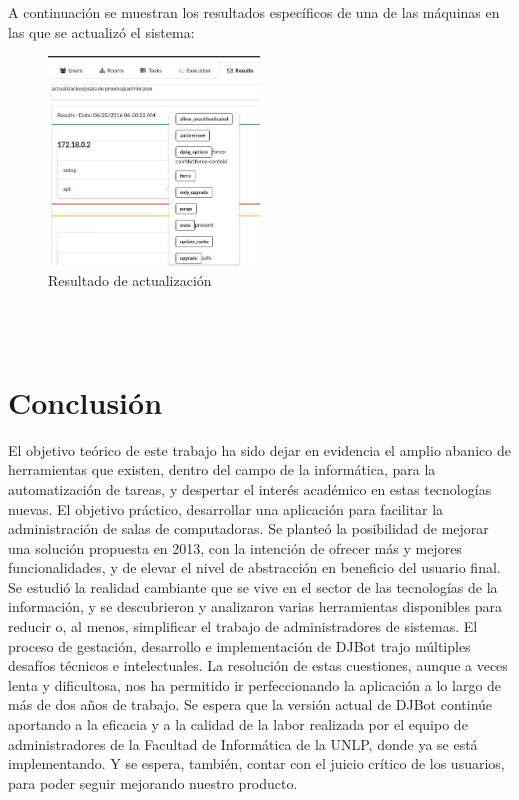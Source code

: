 \documentclass[a4paper,12pt]{article}
\begin{document}
A continuación se muestran los resultados específicos de una de las máquinas en las que se actualizó el sistema:

\begin{figure}[htb]
\centering
\includegraphics[width=0.5\textwidth]{./img/actualizacion.jpg}
\caption{Resultado de actualización}
\end{figure}\\



\newpage\\
\section{Conclusión}
\label{sec:orgheadline31}

El objetivo teórico de este trabajo ha sido dejar en evidencia el amplio abanico de herramientas que existen, dentro del campo de la informática, para la automatización de tareas, y despertar el interés académico en estas tecnologías nuevas. El objetivo práctico, desarrollar una aplicación para facilitar la administración de salas de computadoras. Se planteó la posibilidad de mejorar una solución propuesta en 2013, con la intención de ofrecer más y mejores funcionalidades, y de elevar el nivel de abstracción en beneficio del usuario final. Se estudió la realidad cambiante que se vive en el sector de las tecnologías de la información, y se descubrieron y analizaron varias herramientas disponibles para reducir o, al menos, simplificar el trabajo de administradores de sistemas. El proceso de gestación, desarrollo e implementación de DJBot trajo múltiples desafíos técnicos e intelectuales. La resolución de estas cuestiones, aunque a veces lenta y dificultosa, nos ha permitido ir perfeccionando la aplicación a lo largo de más de dos años de trabajo. Se espera que la versión actual de DJBot continúe aportando a la eficacia y a la calidad de la labor realizada por el equipo de administradores de la Facultad de Informática de la UNLP, donde ya se está implementando. Y se espera, también, contar con el juicio crítico de los usuarios, para poder seguir mejorando nuestro producto.\\
\end{document}
